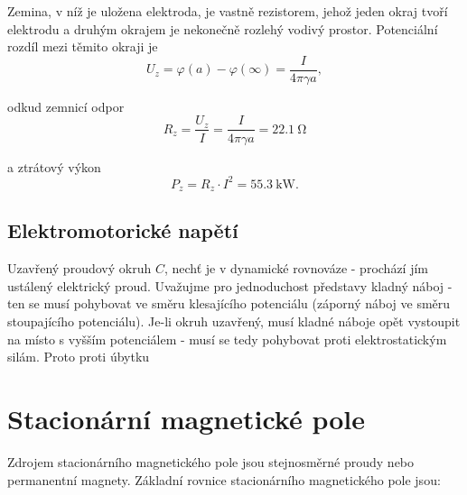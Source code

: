 \begin{example}
        Zemina, v níž je uložena elektroda, je vastně rezistorem, jehož jeden okraj tvoří elektrodu
        a druhým okrajem je nekonečně rozlehý vodivý prostor.
        Potenciální rozdíl mezi těmito okraji je
        \begin{equation*}
         U_z = \varphi(a) - \varphi(\infty)= \frac{I}{4\pi\gamma a},
        \end{equation*} 
        \begin{minipage}[t]{0.5\textwidth}%
        odkud zemnicí odpor 
        \begin{equation*}
          R_z = \frac{U_z}{I} = \frac{I}{4\pi\gamma a} = \SI{22,1}{\ohm}
        \end{equation*}
        \end{minipage}
        \begin{minipage}[t]{0.5\textwidth}%
        a ztrátový výkon 
        \begin{equation*}
          P_z = R_z\cdot I^2 = \SI{55,3}{\kilo\watt}. 
        \end{equation*}
        \end{minipage}
      \end{example}
      
    \subsection{Elektromotorické napětí}
      Uzavřený proudový okruh $C$, nechť je v dynamické rovnováze - prochází jím ustálený
      elektrický proud. Uvažujme pro jednoduchost představy kladný náboj - ten se musí pohybovat ve
      směru klesajícího potenciálu (záporný náboj ve směru stoupajícího potenciálu). Je-li okruh
      uzavřený, musí kladné náboje opět vystoupit na místo s vyšším potenciálem - musí se tedy
      pohybovat proti elektrostatickým silám. Proto proti úbytku      
               
  \newpage
  \section{Stacionární magnetické pole}
    Zdrojem stacionárního magnetického pole jsou stejnosměrné proudy nebo permanentní magnety.
    Základní rovnice stacionárního magnetického pole jsou:

